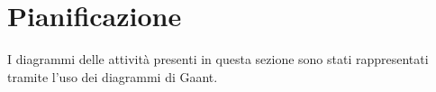 %


\section{Pianificazione} %
\label{sec:pianificazione}
I diagrammi delle attività presenti in questa sezione sono stati rappresentati tramite l'uso dei diagrammi di Gaant.
